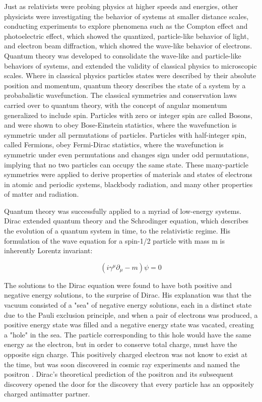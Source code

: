 \indent Just as relativists were probing physics at higher speeds and energies, other physicists were investigating the behavior of systems at smaller distance scales, conducting experiments to explore phenomena such as the Compton effect and photoelectric effect, which showed the quantized, particle-like behavior of light, and electron beam diffraction, which showed the wave-like behavior of electrons. Quantum theory was developed to consolidate the wave-like and particle-like behaviors of systems, and extended the validity of classical physics to microscopic scales. Where in classical physics particles states were described by their absolute position and momentum, quantum theory describes the state of a system by a probabalistic wavefunction. The classical symmetries and conservation laws carried over to quantum theory, with the concept of angular momentum generalized to include spin. Particles with zero or integer spin are called Bosons, and were shown to obey Bose-Einstein statistics, where the wavefunction is symmetric under all permutations of particles. Particles with half-integer spin, called Fermions, obey Fermi-Dirac statistics, where the wavefunction is symmetric under even permutations and changes sign under odd permutations, implying that no two particles can occupy the same state. These many-particle symmetries were applied to derive properties of materials and states of electrons in atomic and periodic systems, blackbody radiation, and many other properties of matter and radiation.

\indent Quantum theory was successfully applied to a myriad of low-energy systems. Dirac extended quantum theory and the Schrodinger equation, which describes the evolution of a quantum system in time, to the relativistic regime. His formulation of the wave equation for a spin-1/2 particle with mass m is inherently Lorentz invariant:

\begin{equation}
(i \gamma^\mu \partial_\mu - m)\psi = 0
\end{equation}

The solutions to the Dirac equation were found to have both positive and negative energy solutions, to the surprise of Dirac. His explanation was that the vacuum consisted of a "sea" of negative energy solutions, each in a distinct state due to the Pauli exclusion principle, and when a pair of electrons was produced, a positive energy state was filled and a negative energy state was vacated, creating a "hole" in the sea. The particle corresponding to this hole would have the same energy as the electron, but in order to conserve total charge, must have the opposite sign charge. This positively charged electron was not know to exist at the time, but was soon discovered in cosmic ray experiments and named the positron \cite{Bettini}. Dirac's theoretical prediction of the positron and its subsequent discovery opened the door for the discovery that every particle has an oppositely charged antimatter partner. 

